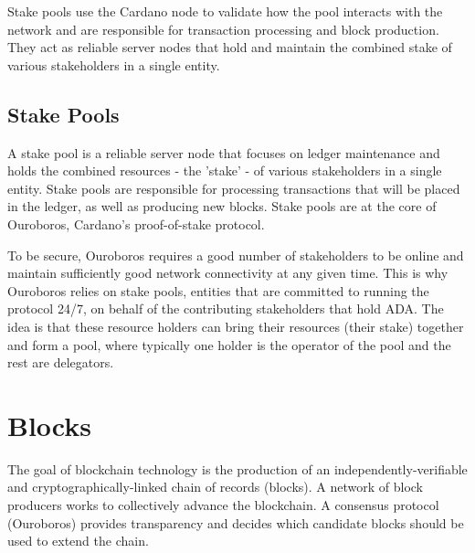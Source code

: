 \vspace{0.2cm}

\noindent
Stake pools use the Cardano node to validate how the pool interacts with the network 
and are responsible for transaction processing and block production. They act as reliable 
server nodes that hold and maintain the combined stake of various stakeholders in a 
single entity.

\vspace{0.2cm}

\subsection{Stake Pools}

A stake pool is a reliable server node that focuses on ledger 
maintenance and holds the combined resources - the 'stake' - of 
various stakeholders in a single entity. Stake pools are responsible 
for processing transactions that will be placed in the ledger, as 
well as producing new blocks. Stake pools are at the core of Ouroboros, 
Cardano's proof-of-stake protocol.

\vspace{0.2cm}

\noindent
To be secure, Ouroboros requires a good number of stakeholders to be 
online and maintain sufficiently good network connectivity at any given 
time. This is why Ouroboros relies on stake pools, entities that are 
committed to running the protocol 24/7, on behalf of the contributing 
stakeholders that hold ADA. The idea is that these resource holders can 
bring their resources (their stake) together and form a pool, where 
typically one holder is the operator of the pool and the rest are 
delegators.

\vspace{0.5cm}

\section{Blocks}

The goal of blockchain technology is the production of an 
independently-verifiable and cryptographically-linked chain of records 
(blocks). A network of block producers works to collectively advance the 
blockchain. A consensus protocol (Ouroboros) provides transparency and 
decides which candidate blocks should be used to extend the chain.

\vspace{0.2cm}

